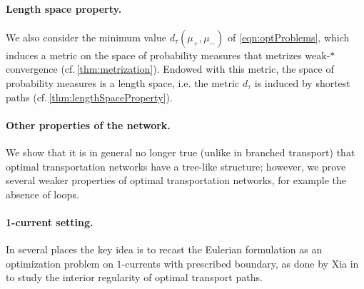 \documentclass[10pt,a4paper,oneside,final]{article}
\newcommand{\dtau}{d_\tau}
\numberwithin{equation}{section}
\theoremstyle{plain}
\theoremstyle{definition}
\theoremstyle{remark}
\begin{document}
\paragraph{Length space property.}

We also consider the minimum value $\dtau(\mu_+,\mu_-)$ of \eqref{eqn:optProblems}, which induces a metric on the space of probability measures that metrizes weak-$*$ convergence (cf.\,\cref{thm:metrization}).
Endowed with this metric, the space of probability measures is a length space, i.e. the metric $\dtau$ is induced by shortest paths (cf.\,\cref{thm:lengthSpaceProperty}).

\paragraph{Other properties of the network.}

We show that it is in general no longer true (unlike in branched transport) that optimal transportation networks have a tree-like structure; however, we prove several weaker properties of optimal transportation networks, for example the absence of loops.

\paragraph{1-current setting.}

In several places the key idea is to recast the Eulerian formulation as an optimization problem on $1$-currents with prescribed boundary, as done by Xia in \cite{Xia-Interior-Regularity} to study the interior regularity of optimal transport paths.
\end{document}
